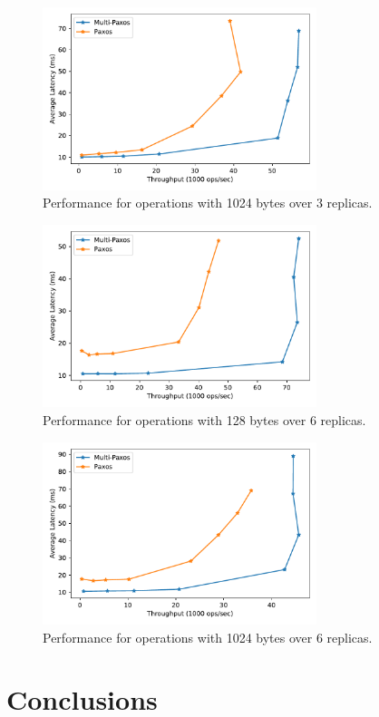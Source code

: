 \documentclass[sigconf]{acmart}
\begin{document}
\begin{figure}[htp]
    \centering
    \includegraphics[width=8cm]{3R_1024B.pdf}
    \caption{Performance for operations with 1024 bytes over 3 replicas.}
    \label{fig:3replicas-1024}
\end{figure}

\begin{figure}[htp]
    \centering
    \includegraphics[width=8cm]{6R_128B.pdf}
    \caption{Performance for operations with 128 bytes over 6 replicas.}
    \label{fig:6replicas-128}
\end{figure}

\begin{figure}[htp]
    \centering
    \includegraphics[width=8cm]{6R_1024B.pdf}
    \caption{Performance for operations with 1024 bytes over 6 replicas.}
    \label{fig:6replicas-1024}
\end{figure}

\section{Conclusions}
\end{document}
